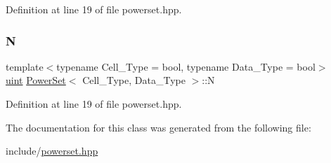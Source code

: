 Definition at line 19 of file powerset.\+hpp.

\mbox{\label{class_power_set_a47a7918d73f8f9709751aae3b1344889}} 
\subsubsection{\texorpdfstring{N}{N}}
{\footnotesize\ttfamily template$<$typename Cell\+\_\+\+Type  = bool, typename Data\+\_\+\+Type  = bool$>$ \\
\hyperlink{typedefs_8hpp_a91ad9478d81a7aaf2593e8d9c3d06a14}{uint} \hyperlink{class_power_set}{Power\+Set}$<$ Cell\+\_\+\+Type, Data\+\_\+\+Type $>$\+::N}



Definition at line 19 of file powerset.\+hpp.



The documentation for this class was generated from the following file\+:\begin{DoxyCompactItemize}
\item 
include/\hyperlink{powerset_8hpp}{powerset.\+hpp}\end{DoxyCompactItemize}
